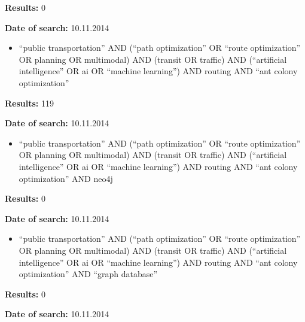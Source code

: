 \par \textbf{Results:} 0
\par \textbf{Date of search:} 10.11.2014
\begin{itemize}
	\item ``public transportation'' AND (``path optimization'' OR ``route optimization'' OR planning OR multimodal)  AND (transit OR traffic) AND (``artificial intelligence'' OR ai OR ``machine learning'') AND routing AND ``ant colony optimization''
\end{itemize}
\par \textbf{Results:} 119
\par \textbf{Date of search:} 10.11.2014
\begin{itemize}
	\item ``public transportation'' AND (``path optimization'' OR ``route optimization'' OR planning OR multimodal)  AND (transit OR traffic) AND (``artificial intelligence'' OR ai OR ``machine learning'') AND routing AND ``ant colony optimization'' AND neo4j
\end{itemize}
\par \textbf{Results:} 0
\par \textbf{Date of search:} 10.11.2014
\begin{itemize}
	\item ``public transportation'' AND (``path optimization'' OR ``route optimization'' OR planning OR multimodal)  AND (transit OR traffic) AND (``artificial intelligence'' OR ai OR ``machine learning'') AND routing AND ``ant colony optimization'' AND ``graph database''
\end{itemize}
\par \textbf{Results:} 0
\par \textbf{Date of search:} 10.11.2014





